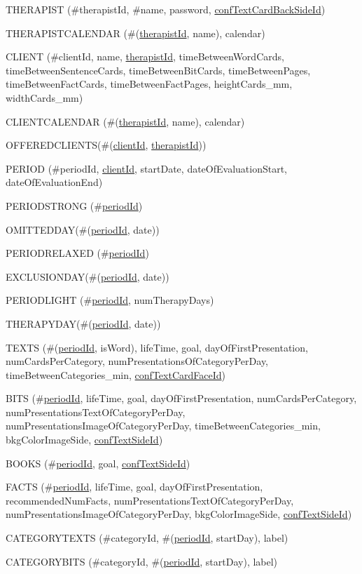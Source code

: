 \begin{list}{}
	\item THERAPIST (\#therapistId, \#name, password, \underline{confTextCardBackSideId})
	\item THERAPISTCALENDAR (\#(\underline{therapistId}, name), calendar)
	\item CLIENT (\#clientId, name, \underline{therapistId}, timeBetweenWordCards,  timeBetweenSentenceCards, timeBetweenBitCards, timeBetweenPages, timeBetweenFactCards, timeBetweenFactPages, heightCards\_mm, widthCards\_mm)
	\item CLIENTCALENDAR (\#(\underline{therapistId}, name), calendar)
	\item OFFEREDCLIENTS(\#(\underline{clientId}, \underline{therapistId}))
	\item PERIOD (\#periodId, \underline{clientId}, startDate, dateOfEvaluationStart, dateOfEvaluationEnd)
	\item PERIODSTRONG (\#\underline{periodId})
	\item OMITTEDDAY(\#(\underline{periodId}, date))
	\item PERIODRELAXED (\#\underline{periodId})
	\item EXCLUSIONDAY(\#(\underline{periodId}, date))
	\item PERIODLIGHT (\#\underline{periodId}, numTherapyDays)
	\item THERAPYDAY(\#(\underline{periodId}, date))
	\item TEXTS (\#(\underline{periodId}, isWord), lifeTime, goal, dayOfFirstPresentation, numCardsPerCategory, numPresentationsOfCategoryPerDay, timeBetweenCategories\_min, \underline{confTextCardFaceId})
	\item BITS (\#\underline{periodId}, lifeTime, goal, dayOfFirstPresentation, numCardsPerCategory, numPresentationsTextOfCategoryPerDay, numPresentationsImageOfCategoryPerDay, timeBetweenCategories\_min, bkgColorImageSide, \underline{confTextSideId})
	\item BOOKS (\#\underline{periodId}, goal, \underline{confTextSideId})
	\item FACTS (\#\underline{periodId}, lifeTime, goal, dayOfFirstPresentation, recommendedNumFacts, numPresentationsTextOfCategoryPerDay, numPresentationsImageOfCategoryPerDay, bkgColorImageSide, \underline{confTextSideId})
	\item CATEGORYTEXTS (\#categoryId, \#(\underline{periodId}, startDay), label)
	\item CATEGORYBITS (\#categoryId, \#(\underline{periodId}, startDay), label)

\end{list}
